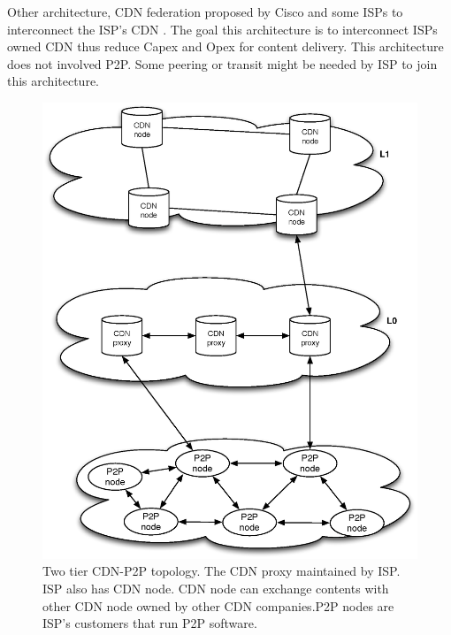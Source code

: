 \documentclass[paper]{ieice}
\begin{document}
Other architecture, CDN federation proposed by Cisco and some ISPs to interconnect the ISP's CDN \cite{federation}.
The goal this architecture is to interconnect ISPs owned CDN thus reduce Capex and Opex for content delivery. 
This architecture does not involved P2P. 
Some peering or transit might be needed by ISP to join this architecture. 
 
\begin{figure}[tb]
\begin{center}
\includegraphics[scale=0.35]{graphs/two-tier-cdn-topology.eps}
\end{center}
\caption{Two tier CDN-P2P topology.
The CDN proxy maintained by ISP. ISP also has CDN node. CDN node can exchange contents with other CDN node owned by other CDN companies.P2P nodes are ISP's customers that run P2P software.}
\label{fig:twotier}
\vspace{-2mm}
\end{figure}
  
\end{document}
